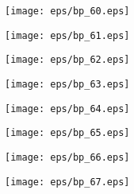 \documentclass{book}
\begin{document}
	\clearpage\begin{figure}[p]
    \centering
	\texttt{[image: eps/bp\_60.eps]}
	\end{figure}
	\clearpage\begin{figure}[p]
    \centering
	\texttt{[image: eps/bp\_61.eps]}
	\end{figure}
	\clearpage\begin{figure}[p]
    \centering
	\texttt{[image: eps/bp\_62.eps]}
	\end{figure}
	\clearpage\begin{figure}[p]
    \centering
	\texttt{[image: eps/bp\_63.eps]}
	\end{figure}
	\clearpage\begin{figure}[p]
    \centering
	\texttt{[image: eps/bp\_64.eps]}
	\end{figure}
	\clearpage\begin{figure}[p]
    \centering
	\texttt{[image: eps/bp\_65.eps]}
	\end{figure}
	\clearpage\begin{figure}[p]
    \centering
	\texttt{[image: eps/bp\_66.eps]}
	\end{figure}
	\clearpage\begin{figure}[p]
    \centering
	\texttt{[image: eps/bp\_67.eps]}
	\end{figure}
	\clearpage
\end{document}
